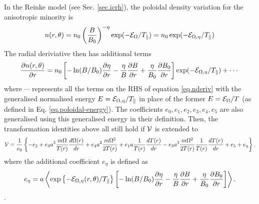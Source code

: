 In the Reinke model (see Sec. \ref{sec.icrh}), the poloidal density variation for the anisotropic minority is
\begin{equation}
 n(r,\theta) = n_0 \left( \frac{B}{B_0} \right)^{-\eta} \exp(-{\cal E}_{\Omega}/T_\parallel) = n_0 \exp(-{\cal E}_{\Omega,\eta}/T_\parallel)
\end{equation}
The radial deriviative then has additional terms 
\begin{equation}
\frac{\partial n(r,\theta)}{\partial r} = n_0
\left[ -\ln(B/B_0)\frac{\partial \eta}{\partial r} - \frac{\eta}{B}\frac{\partial B}{\partial r} + \frac{\eta}{B_0}\frac{\partial B_0}{\partial r} \right]
\exp(-{\cal E}_{\Omega,\eta}/T_\parallel) + \cdots
\end{equation}
where $\cdots$ represents all the terms on the RHS of equation \ref{eq.nderiv} with the generalised normalised energy $E = {\cal E}_{\Omega,\eta}/T_\parallel $
in place of the former $E = {\cal E}_{\Omega}/T $ (as defined in Eq. \ref{eq.poloidal-energy}).  The coefficients $e_0,e_1,e_2,e_3,e_4,e_5$ are also generalised 
using this generalised energy in their definition.
Then, the transformation identities above all still hold if $\cal{V}$ is extended to
\begin{equation}
{\cal V} = \frac{1}{e_0} \left\{ - e_2 
+ e_3 a^3 \frac{m\Omega}{T(r)} \frac{d \Omega(r)}{d r}
+ e_4 a^2 \frac{m\Omega^2}{2T(r)} 
+ e_1 a \frac{1}{T(r)} \frac{d T(r)} {d r} 
- e_3 a^3 \frac{m\Omega^2}{2T(r)} \frac{1}{T(r)} \frac{d T(r)} {d r} + e_5 + e_\eta
\right\}.
\label{eq.vcalex}
\end{equation}
where the additional coefficient $e_\eta$ is defined as
\[
e_\eta = a \left \langle \exp\left\{-{\cal E}_{\Omega,\eta}(r,\theta)/T_\parallel\right\} \left[ -\ln(B/B_0)\frac{\partial \eta}{\partial r} - \frac{\eta}{B}\frac{\partial B}{\partial r}
+ \frac{\eta}{B_0}\frac{\partial B_0}{\partial r} \right] \right \rangle.
\].

